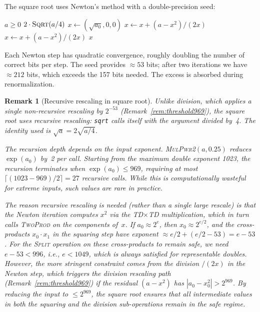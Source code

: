\documentclass[11pt,a4paper]{article}
\newtheorem{remark}{Remark}
\begin{document}
The square root uses Newton's method with a double-precision seed:
\begin{algorithmic}[1]
\Require $a \ge 0$
 
  \State \Return $2 \cdot \textsc{Sqrt}(a/4)$
\EndIf
\State $x \gets (\sqrt{a_0}, 0, 0)$ 
\State $x \gets x + (a - x^2) / (2x)$ 
\State $x \gets x + (a - x^2) / (2x)$ 
\State \Return $x$
\end{algorithmic}
Each Newton step has quadratic convergence, roughly doubling the
number of correct bits per step.  The seed provides $\approx 53$
bits; after two iterations we have $\approx 212$ bits, which
exceeds the 157 bits needed.  The excess is absorbed during
renormalization.

\begin{remark}[Recursive rescaling in square root]
\label{rem:sqrt-recurse}
Unlike division, which applies a single non-recursive rescaling
by $2^{-53}$ (Remark~\ref{rem:threshold969}), the square root
uses \emph{recursive} rescaling: \texttt{sqrt} calls itself with
the argument divided by~4.  The identity used is
$\sqrt{a} = 2\sqrt{a/4}$.

The recursion depth depends on the input exponent.
\textsc{MulPwr2}$(a, 0.25)$ reduces $\exp(a_0)$ by~2 per call.
Starting from the maximum double exponent 1023, the recursion
terminates when $\exp(a_0) \le 969$, requiring at most
$\lceil(1023 - 969)/2\rceil = 27$ recursive calls.  While this
is computationally wasteful for extreme inputs, such values are
rare in practice.

The reason recursive rescaling is needed (rather than a single
large rescale) is that the Newton iteration computes $x^2$ via
the TD$\times$TD multiplication, which in turn calls
\textsc{TwoProd} on the components of~$x$.  If $a_0 \approx
2^{e}$, then $x_0 \approx 2^{e/2}$, and the cross-products
$x_0 \cdot x_1$ in the squaring step have exponent $\approx
e/2 + (e/2 - 53) = e - 53$.  For the \textsc{Split} operation
on these cross-products to remain safe, we need $e - 53 < 996$,
i.e., $e < 1049$, which is always satisfied for representable
doubles.  However, the more stringent constraint comes from
the \emph{division} $/(2x)$ in the Newton step, which triggers
the division rescaling path (Remark~\ref{rem:threshold969}) if
the residual $(a - x^2)$ has $|a_0 - x_0^2| > 2^{969}$.
By reducing the input to $\le 2^{969}$, the square root
ensures that all intermediate values in both the squaring and
the division sub-operations remain in the safe regime.
\end{remark}
\end{document}

